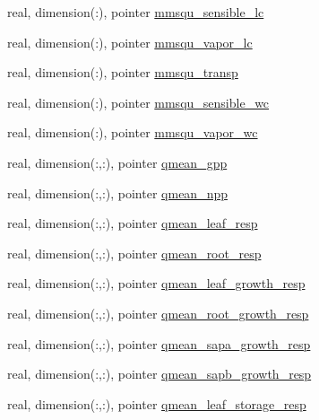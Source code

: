 \begin{DoxyCompactItemize}
\item 
real, dimension(\+:), pointer \hyperlink{structed__state__vars_1_1patchtype_a723d7c8eac2c468a11072b84aa5a960a}{mmsqu\+\_\+sensible\+\_\+lc}
\item 
real, dimension(\+:), pointer \hyperlink{structed__state__vars_1_1patchtype_aa4d3046770f4001c7e95705cd11f6ad6}{mmsqu\+\_\+vapor\+\_\+lc}
\item 
real, dimension(\+:), pointer \hyperlink{structed__state__vars_1_1patchtype_ad4eabcaf09eb71b0e1e62dad77ec76e3}{mmsqu\+\_\+transp}
\item 
real, dimension(\+:), pointer \hyperlink{structed__state__vars_1_1patchtype_a8a8170f005a2e2eabb758286775643ac}{mmsqu\+\_\+sensible\+\_\+wc}
\item 
real, dimension(\+:), pointer \hyperlink{structed__state__vars_1_1patchtype_a21b9218eacb41b2530991eee41b357cb}{mmsqu\+\_\+vapor\+\_\+wc}
\item 
real, dimension(\+:,\+:), pointer \hyperlink{structed__state__vars_1_1patchtype_a791c10ed029cfb5d93106bd709da41b4}{qmean\+\_\+gpp}
\item 
real, dimension(\+:,\+:), pointer \hyperlink{structed__state__vars_1_1patchtype_a3ba6b95dd37dd37c191d93cd0e21ad8f}{qmean\+\_\+npp}
\item 
real, dimension(\+:,\+:), pointer \hyperlink{structed__state__vars_1_1patchtype_ad02fdd72a28c9c532e76936055482941}{qmean\+\_\+leaf\+\_\+resp}
\item 
real, dimension(\+:,\+:), pointer \hyperlink{structed__state__vars_1_1patchtype_a7a13671160ff09bb7d973d3c386d8819}{qmean\+\_\+root\+\_\+resp}
\item 
real, dimension(\+:,\+:), pointer \hyperlink{structed__state__vars_1_1patchtype_a1eb4c993817a85c6bc15905333b4593f}{qmean\+\_\+leaf\+\_\+growth\+\_\+resp}
\item 
real, dimension(\+:,\+:), pointer \hyperlink{structed__state__vars_1_1patchtype_ad8f88aae4afa5d511f61fd834d39b8e4}{qmean\+\_\+root\+\_\+growth\+\_\+resp}
\item 
real, dimension(\+:,\+:), pointer \hyperlink{structed__state__vars_1_1patchtype_a99b79bf88ce9aac36f4a60d4c722522b}{qmean\+\_\+sapa\+\_\+growth\+\_\+resp}
\item 
real, dimension(\+:,\+:), pointer \hyperlink{structed__state__vars_1_1patchtype_a37b7c879cd7ea92e10c214d8f3186c5b}{qmean\+\_\+sapb\+\_\+growth\+\_\+resp}
\item 
real, dimension(\+:,\+:), pointer \hyperlink{structed__state__vars_1_1patchtype_ad66b45011ccd4e846f0a9427a967f063}{qmean\+\_\+leaf\+\_\+storage\+\_\+resp}

\end{DoxyCompactItemize}

